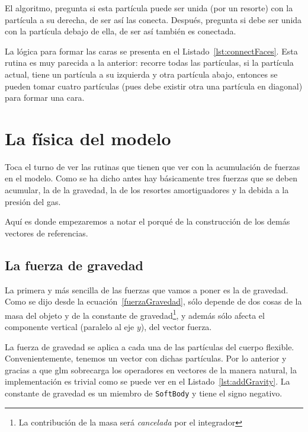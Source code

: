 El algoritmo, pregunta si esta partícula puede ser unida (por un resorte) con la partícula a su derecha, de ser así las conecta. Después, pregunta si debe ser unida con la partícula debajo de ella, de ser así también es conectada.


La lógica para formar las caras se presenta en el Listado~\ref{lst:connectFaces}.
Esta rutina es muy parecida a la anterior: recorre todas las partículas, si la partícula actual, tiene un partícula a su izquierda y otra partícula abajo, entonces se pueden tomar cuatro partículas (pues debe existir otra una partícula en diagonal) para formar una cara.

\section{La física del modelo}
Toca el turno de ver las rutinas que tienen que ver con la acumulación de fuerzas en el modelo.
Como se ha dicho antes hay básicamente tres fuerzas que se deben acumular, la de la gravedad, la de los resortes amortiguadores y la debida a la presión del gas.

Aquí es donde empezaremos a notar el porqué de la construcción de los demás vectores de referencias.

\subsection{La fuerza de gravedad}
La primera y más sencilla de las fuerzas que vamos a poner es la de gravedad.
Como se dijo desde la ecuación~\eqref{fuerzaGravedad}, sólo depende de dos cosas de la masa del objeto y de la constante de gravedad\footnote{La contribución de la masa será \emph{cancelada} por el integrador}, y además sólo afecta el componente vertical (paralelo al eje $y$), del vector fuerza.

La fuerza de gravedad se aplica a cada una de las partículas del cuerpo flexible. 
Convenientemente, tenemos un vector con dichas partículas.
Por lo anterior y gracias a que glm sobrecarga los operadores en vectores de la manera natural, la implementación es trivial como se puede ver en el Listado~\ref{lst:addGravity}.
La constante de gravedad es un miembro de \texttt{SoftBody} y tiene el signo negativo.

